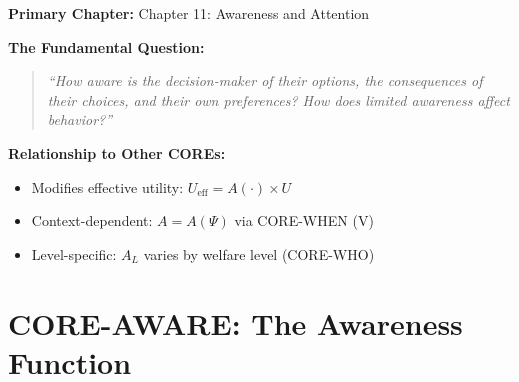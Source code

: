 \begin{tcolorbox}[colback=purple!5!white, colframe=purple!75!black,
    title=Chapter Linkage]

\textbf{Primary Chapter:} Chapter 11: Awareness and Attention

\textbf{The Fundamental Question:}
\begin{quote}
\textit{``How aware is the decision-maker of their options, the consequences of their
choices, and their own preferences? How does limited awareness affect behavior?''}
\end{quote}

\textbf{Relationship to Other COREs:}
\begin{itemize}[nosep]
\item Modifies effective utility: $U_{\text{eff}} = A(\cdot) \times U$
\item Context-dependent: $A = A(\Psi)$ via CORE-WHEN (V)
\item Level-specific: $A_L$ varies by welfare level (CORE-WHO)
\end{itemize}

\end{tcolorbox}

\chapter{CORE-AWARE: The Awareness Function}
\label{app:core-aware}

\begin{abstract}
This appendix answers the sixth fundamental question:
\textit{``How aware is the individual?''}
We establish that behavior depends not just on utility ($U$) but on \textit{perceived}
utility, filtered through awareness: $U_{\text{eff}} = A(\cdot) \times U$.
The Awareness Function $A(\cdot) \in [0, 1]$ captures information availability,
attention allocation, salience, and metacognitive accuracy.
\end{abstract}

